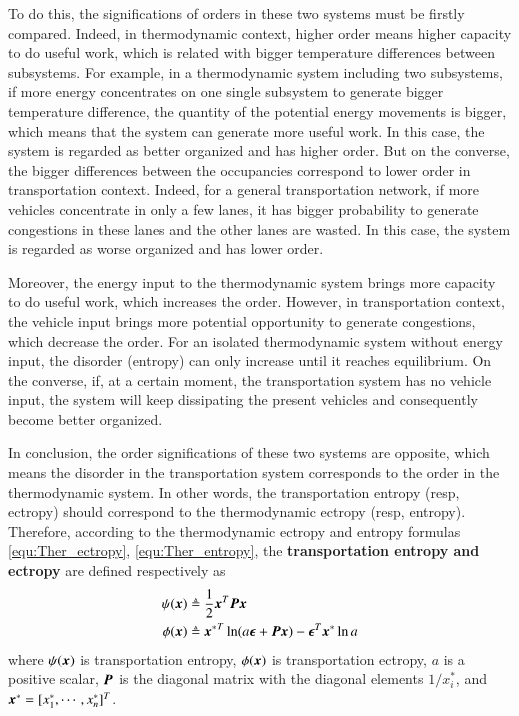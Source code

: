 \documentclass[preprint,authoryear,12pt]{elsarticle}
\renewcommand{\vec}[1]{\mbox{\boldmath$#1$}}
\newcommand{\mat}[1]{\mbox{\boldmath$#1$}}
\begin{document}
To do this, the significations of orders in these two systems must be
firstly compared. Indeed, in thermodynamic context, higher order
means higher capacity to do useful work, which is related with bigger
temperature differences between subsystems. For example, in a
thermodynamic system including two subsystems, if more energy
concentrates on one single subsystem to generate bigger temperature
difference, the quantity of the potential energy movements is bigger,
which means that the system can generate more useful work. In this
case, the system is regarded as better organized and has higher
order. But on the converse, the bigger differences between the
occupancies correspond to lower order in transportation context.
Indeed, for a general transportation network, if more vehicles
concentrate in only a few lanes, it has bigger probability to
generate congestions in these lanes and the other lanes are wasted.
In this case, the system is regarded as worse organized and has lower
order.

Moreover, the energy input to the thermodynamic system brings more
capacity to do useful work, which increases the order. However, in
transportation context, the vehicle input brings more potential
opportunity to generate congestions, which decrease the order. For an
isolated thermodynamic system without energy input, the disorder
(entropy) can only increase until it reaches equilibrium. On the
converse, if, at a certain moment, the transportation system has no
vehicle input, the system will keep dissipating the present vehicles
and consequently become better organized.

In conclusion, the order significations of these two systems are
opposite, which means the disorder in the transportation system
corresponds to the order in the thermodynamic system. In other words,
the transportation entropy (resp, ectropy) should correspond to the
thermodynamic ectropy (resp, entropy). Therefore, according to the
thermodynamic ectropy and entropy formulas \eqref{equ:Ther_ectropy},
\eqref{equ:Ther_entropy}, the \textbf{transportation entropy and
ectropy} are defined respectively as
\begin{align}
\label{equ:Tran_entropy}
\psi(\vec{x}) &\triangleq \frac{1}{2}\vec{x}^T \mat{P} \vec{x}\\
\phi(\vec{x}) &\triangleq{\vec{x}^*}^T \ln
(a\vec{\epsilon}+\mat{P}\vec{x}) -\vec{\epsilon}^T\vec{x}^*\ln a
\label{equ:Tran_ectropy}
\end{align}
where $\psi(\vec{x})$ is transportation entropy, $\phi(\vec{x})$ is
transportation ectropy, $a$ is a positive scalar, $\mat{P}$ is the
diagonal matrix with the diagonal elements $1/x_i^*$, and
$\vec{x}^*=[x_1^*,\cdots,x_n^*]^T$.
\end{document}
